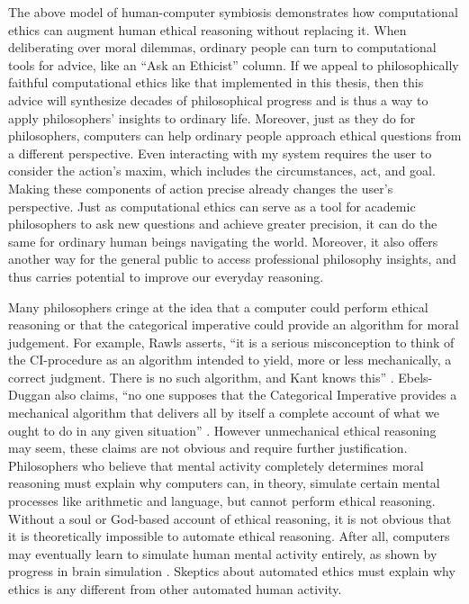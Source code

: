 \begin{isabellebody}
\begin{isamarkuptext}
The above model of human-computer symbiosis demonstrates how computational ethics can augment human
ethical reasoning without replacing it. When deliberating over moral dilemmas, ordinary people can 
turn to computational tools for advice, like an ``Ask an Ethicist'' column. If we appeal to philosophically
faithful computational ethics like that implemented in this thesis, then this advice will synthesize 
decades of philosophical progress and is thus a way to apply philosophers' insights to ordinary life. 
Moreover, just as they do for philosophers, computers can help ordinary people approach ethical questions from a 
different perspective. Even interacting with my system requires the user to consider the action's maxim, 
which includes the circumstances, act, and goal. Making these components of action precise already changes
the user's perspective. Just as computational ethics can serve as a tool for academic philosophers to 
ask new questions and achieve greater precision, it can do the same for ordinary human beings navigating
the world. Moreover, it also offers another way for the general public to access professional philosophy
insights, and thus carries potential to improve our everyday reasoning.%
\end{isamarkuptext}\isamarkuptrue%
%
\isadelimdocument
%
\endisadelimdocument
%
\isatagdocument
%
\isamarkuptrue%
%
\endisatagdocument
{\isafolddocument}%
%
\isadelimdocument
%
\endisadelimdocument
%
\begin{isamarkuptext}%
Many philosophers cringe at the idea that a computer could perform ethical reasoning or that the 
categorical imperative could provide an algorithm for moral judgement. For example, Rawls asserts, 
``it is a serious misconception to think of the CI-procedure as an algorithm intended to yield, 
more or less mechanically, a correct judgment. There is no such algorithm, and Kant knows this'' \citep[166]{rawlslectures}. 
Ebels-Duggan also claims, ``no one supposes that the Categorical Imperative provides a mechanical 
algorithm that delivers all by itself a complete account of what we ought to do in any given 
situation'' \citep[174]{ebelsduggan}. However unmechanical ethical reasoning
may seem, these claims are not obvious and require further justification. Philosophers who believe 
that mental activity completely determines moral reasoning must explain why computers can, in theory, 
simulate certain mental processes like arithmetic and language, but cannot perform ethical reasoning. 
Without a soul or God-based account of ethical reasoning, it is not obvious that it is theoretically 
impossible to automate ethical reasoning. After all, computers may eventually learn to simulate human 
mental activity entirely, as shown by progress in brain simulation \citep{brainsimulation}. Skeptics
about automated ethics must explain why ethics is any different from other automated human activity.


\end{isamarkuptext}
\end{isabellebody}
